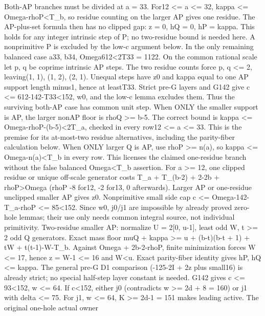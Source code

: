 \documentclass[11pt,a4paper]{article}
\begin{document}
Both-AP branches must be divided at a = 33. For12 \textless= a
\textless= 32, kappa \textless= Omega-rhoP\textless T\_b, so residue
counting on the larger AP gives one residue. The AP-plus-set formula
then has no clipped gap: z = 0, hQ = 0, hP = kappa. This holds for any
integer intrinsic step of P; no two-residue bound is needed here. A
nonprimitive P is excluded by the low-c argument below. In the only
remaining balanced case a33, b34, Omega612\textless2T33 = 1122. On the
common rational scale let p, q be coprime intrinsic AP steps. The two
residue counts force p, q \textless= 2, leaving(1, 1), (1, 2), (2, 1).
Unequal steps have z0 and kappa equal to one AP support length minus1,
hence at leastT33. Strict pre-G layers and G142 give c \textless=
612-142-T33\textless152, w0, and the low-c lemma excludes them. Thus the
surviving both-AP case has common unit step. When ONLY the smaller
support is AP, the larger nonAP floor is rhoQ \textgreater= b-5. The
correct bound is kappa \textless= Omega-rhoP-(b-5)\textless2T\_a,
checked in every row12 \textless= a \textless= 33. This is the premise
for its at-most-two residue alternatives, including the parity-fiber
calculation below. When ONLY larger Q is AP, use rhoP \textgreater=
n(a), so kappa \textless= Omega-n(a)\textless T\_b in every row. This
licenses the claimed one-residue branch without the false balanced
Omega\textless T\_b assertion. For a \textgreater= 12, one clipped
residue or unique off-scale generator costs T\_a + T\_(b-2) + 2-2b +
rhoP\textgreater Omega (rhoP -8 for12, -2 for13, 0 afterwards). Larger
AP or one-residue unclipped smaller AP gives z0. Nonprimitive small side
cap c \textless= Omega-142-T\_a-rhoP \textless= 85\textless152. Since
w0, j0/j1 are impossible by already proved zero-hole lemmas; their use
only needs common integral source, not individual primitivity.
Two-residue smaller AP: normalize U = 2{[}0, u-1{]}, least odd W, t
\textgreater= 2 odd Q generators. Exact mass floor muQ + kappa
\textgreater= u + (b-t)(b-t + 1) + tW + t(t-1)-W-T\_b. Against Omega +
2b-2-rhoP, finite minimization forces W \textless= 17, hence z = W-1
\textless= 16 and W\textless u. Exact parity-fiber identity gives hP, hQ
\textless= kappa. The general pre-G D1 comparison (-125-2I + 2z plus
small16) is already strict; no special half-step layer constant is
needed. G142 gives c \textless= 93\textless152, w \textless= 64. If
c\textless152, either j0 (contradicts w \textgreater= 2d + 8 = 160) or
j1 with delta \textless= 75. For j1, w \textless= 64, K \textgreater=
2d-1 = 151 makes leading active. The original one-hole actual owner
\end{document}
